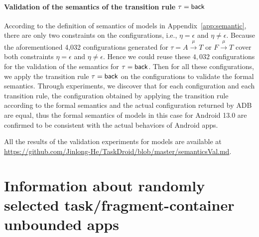 \paragraph{Validation of the semantics of the transition rule $\tau = {\mathsf{back} }$}
%
According to the definition of semantics of {\AMASS} models in Appendix~\ref{app:semantic}, there are only two constraints on the configurations, i.e., $\eta = \epsilon$ and $\eta \neq \epsilon$. Because  the aforementioned 4,032 configurations generated for $\tau = A \xrightarrow{\mu} T$ or $F \xrightarrow{\mu} T$ cover both constraints $\eta = \epsilon$ and $\eta \neq \epsilon$.  Hence we could reuse these $4,032$ configurations for the validation of the semantics for $\tau = {\mathsf{back} }$. 
%
Then for all these configurations, we apply the transition rule $\tau = {\mathsf{back} }$ on the configurations to validate the formal semantics. Through experiments, we discover that for each configuration and each transition rule, the configuration obtained by applying the transition rule according to the formal semantics and the actual configuration returned by ADB are equal, thus the formal semantics of {\AMASS} models in this case for Android 13.0 are confirmed to be consistent with the actual behaviors of Android apps.  

\medskip

All the results of the validation experiments for {\AMASS} models are available at \url{https://github.com/Jinlong-He/TaskDroid/blob/master/semanticsVal.md}. 



\section{Information about randomly selected task/fragment-container unbounded apps} \label{app:table}

